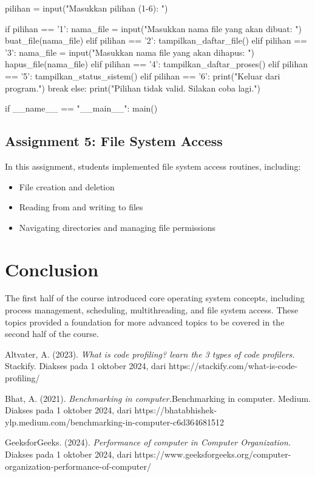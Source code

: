 \documentclass[12pt]{article}
\begin{document}
\begin{python}
            pilihan = input("Masukkan pilihan (1-6): ")
    
            if pilihan == '1':
                nama_file = input("Masukkan nama file yang akan dibuat: ")
                buat_file(nama_file)
            elif pilihan == '2':
                tampilkan_daftar_file()
            elif pilihan == '3':
                nama_file = input("Masukkan nama file yang akan dihapus: ")
                hapus_file(nama_file)
            elif pilihan == '4':
                tampilkan_daftar_proses()
            elif pilihan == '5':
                tampilkan_status_sistem()
            elif pilihan == '6':
                print("Keluar dari program.")
                break
            else:
                print("Pilihan tidak valid. Silakan coba lagi.")
    
    if __name__ == "__main__":
        main()
\end{python}

\subsection{Assignment 5: File System Access}
In this assignment, students implemented file system access routines, including:
\begin{itemize}
    \item File creation and deletion
    \item Reading from and writing to files
    \item Navigating directories and managing file permissions
\end{itemize}

\section{Conclusion}
The first half of the course introduced core operating system concepts, including process management, scheduling, multithreading, and file system access. These topics provided a foundation for more advanced topics to be covered in the second half of the course.

\begin{thebibliography}{3}
    Altvater, A. (2023). \textit{What is code profiling? learn the 3 types of code profilers.} Stackify. Diakses pada 1 oktober 2024, dari https://stackify.com/what-is-code-profiling/ 
    
    Bhat, A. (2021). \textit{Benchmarking in computer.}Benchmarking in computer. Medium. Diakses pada 1 oktober 2024, dari https://bhatabhishek-ylp.medium.com/benchmarking-in-computer-c6d364681512 

    GeeksforGeeks. (2024). \textit{Performance of computer in Computer Organization.} Diakses pada 1 oktober 2024, dari https://www.geeksforgeeks.org/computer-organization-performance-of-computer/ 
\end{thebibliography}
\end{document}
